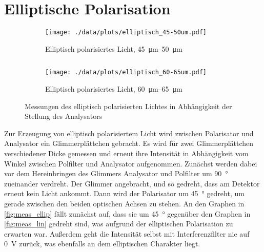 \section{Elliptische Polarisation}
\begin{figure}[tb]
	\begin{subfigure}{.4\textwidth}
		\centering
		\texttt{[image: ./data/plots/elliptisch\_45-50um.pdf]}
		\caption[\SIrange{45}{50}{\micro\meter}]{Elliptisch polarisiertes Licht, \SIrange{45}{50}{\micro\meter}}
		\label{subfig:ellip_45_50}
	\end{subfigure}
	$\quad$
	\begin{subfigure}{.4\textwidth}
		\centering
		\texttt{[image: ./data/plots/elliptisch\_60-65um.pdf]}
		\caption[\SIrange{60}{65}{\micro\meter}]{Elliptisch polarisiertes Licht, \SIrange{60}{65}{\micro\meter}}
		\label{subfig:ellip_60_65}
	\end{subfigure}
	\caption[Elliptisch polarisiertes Licht]{Messungen des elliptisch polarisierten Lichtes in Abhängigkeit der Stellung des Analysators}
	\label{fig:meas_ellip}
\end{figure}
Zur Erzeugung von elliptisch polarisiertem Licht wird zwischen Polarisator und Analysator ein Glimmerplättchen gebracht.
Es wird für zwei Glimmerplättchen verschiedener Dicke gemessen und erneut ihre Intensität in Abhängigkeit vom Winkel zwischen Polfilter und Analysator aufgenommen.
Zunächst werden dabei vor dem Hereinbringen des Glimmers Analysator und Polfilter um \SI{90}{\degree} zueinander verdreht.
Der Glimmer angebracht, und so gedreht, dass am Detektor erneut kein Licht ankommt.
Dann wird der Polarisator um \SI{45}{\degree} gedreht, um gerade zwischen den beiden optischen Achsen zu stehen.
An den Graphen in \autoref{fig:meas_ellip} fällt zunächst auf, dass sie um \SI{45}{\degree} gegenüber den Graphen in \autoref{fig:meas_lin} gedreht sind, was aufgrund der elliptischen Polarisation zu erwarten war.
Außerdem geht die Intensität selbst mit Interferenzfilter nie auf \SI{0}{\volt} zurück, was ebenfalls an dem elliptischen Charakter liegt.
